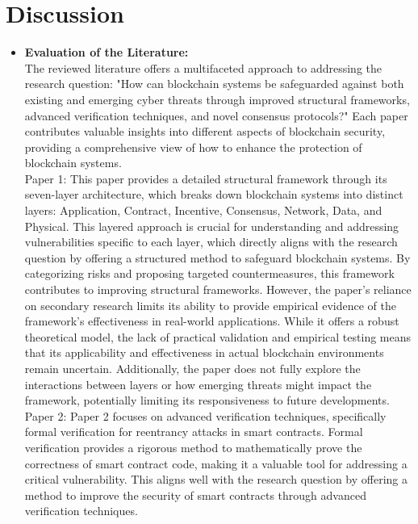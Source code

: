 \documentclass[12pt,a4paper]{article}
\begin{document}
\section{Discussion}
\begin{itemize}
    \item \textbf{Evaluation of the Literature:} 
    \\
The reviewed literature offers a multifaceted approach to addressing the research question: "How can blockchain systems be safeguarded against both existing and emerging cyber threats through improved structural frameworks, advanced verification techniques, and novel consensus protocols?" Each paper contributes valuable insights into different aspects of blockchain security, providing a comprehensive view of how to enhance the protection of blockchain systems.
\\
Paper 1: This paper provides a detailed structural framework through its seven-layer architecture, which breaks down blockchain systems into distinct layers: Application, Contract, Incentive, Consensus, Network, Data, and Physical. This layered approach is crucial for understanding and addressing vulnerabilities specific to each layer, which directly aligns with the research question by offering a structured method to safeguard blockchain systems. By categorizing risks and proposing targeted countermeasures, this framework contributes to improving structural frameworks.
However, the paper's reliance on secondary research limits its ability to provide empirical evidence of the framework's effectiveness in real-world applications. While it offers a robust theoretical model, the lack of practical validation and empirical testing means that its applicability and effectiveness in actual blockchain environments remain uncertain. Additionally, the paper does not fully explore the interactions between layers or how emerging threats might impact the framework, potentially limiting its responsiveness to future developments.
\\
Paper 2:
Paper 2 focuses on advanced verification techniques, specifically formal verification for reentrancy attacks in smart contracts. Formal verification provides a rigorous method to mathematically prove the correctness of smart contract code, making it a valuable tool for addressing a critical vulnerability. This aligns well with the research question by offering a method to improve the security of smart contracts through advanced verification techniques.


\end{itemize}
\end{document}
